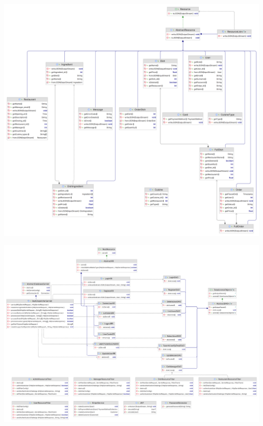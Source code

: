 \begin{center}
    \includegraphics[width=1.0\textwidth]{resources/class-diagrams/dbentities_class_diagram}
    \label{fig:class-dbentities}
\end{center}


\begin{center}
    \includegraphics[width=1.0\textwidth]{resources/class-diagrams/user_class_diagram}
    \label{fig:class-user}
\end{center}


